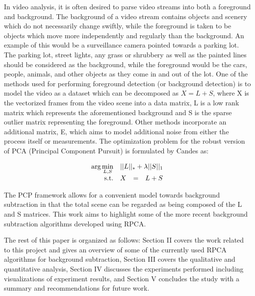 \documentclass[conference]{IEEEtran}
\begin{document}
In video analysis, it is often desired to parse video streams into both a foreground and background. The background of a video stream contains objects and scenery which do not necessarily change swiftly, while the foreground is taken to be objects which move more independently and regularly than the background. An example of this would be a surveillance camera pointed towards a parking lot. The parking lot, street lights, any grass or shrubbery as well as the painted lines should be considered as the background, while the foreground would be the cars, people, animals, and other objects as they come in and out of the lot. One of the methods used for performing foreground detection (or background detection) is to model the video as a dataset which can be decomposed as $ X = L + S $, where X is the vectorized frames from the video scene into a data matrix, L is a low rank matrix which represents the aforementioned background and S is the sparse outlier matrix representing the foreground. Other methods incorporate an additional matrix, E, which aims to model additional noise from either the process itself or measurements. The optimization problem for the robust version of PCA (Principal Component Pursuit) is formulated by Candes \cite{Candes} as:

\begin{equation} \label{eq:PCP}
\begin{array}{rrclcl}
\textrm{arg} \displaystyle \min_{L,S} & \multicolumn{3}{l}{||L||_* + \lambda ||S||_1} \\
\textrm{s.t.} & X & = & L + S \\
\end{array}
\end{equation}

The PCP framework allows for a convenient model towards background subtraction in that the total scene can be regarded as being composed of the L and S matrices. This work aims to highlight some of the more recent background subtraction algorithms developed using RPCA.


The rest of this paper is organized as follows: Section II covers the work related to this project and gives an overview of some of the currently used RPCA algorithms for background subtraction, Section III covers the qualitative and quantitative analysis, Section IV discusses the experiments performed including visualizations of experiment results, and Section V concludes the study with a summary and recommendations for future work.
\end{document}
